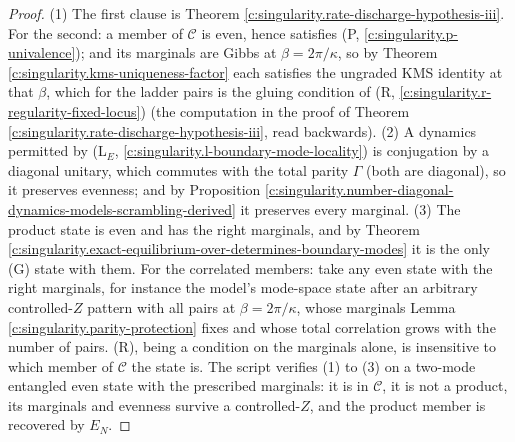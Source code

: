 \documentclass[11pt]{article}
\theoremstyle{definition}
\theoremstyle{plain}
\providecommand{\EN}{}\renewcommand{\EN}{E_{N}}
\begin{document}
\begin{proof}
(1) The first clause is Theorem \ref{c:singularity.rate-discharge-hypothesis-iii}. For the second: a member of $\mathcal{C}$ is even, hence satisfies (P, \ref{c:singularity.p-univalence}); and its marginals are Gibbs at $\beta = 2\pi/\kappa$, so by Theorem \ref{c:singularity.kms-uniqueness-factor} each satisfies the ungraded KMS identity at that $\beta$, which for the ladder pairs is the gluing condition of (R, \ref{c:singularity.r-regularity-fixed-locus}) (the computation in the proof of Theorem \ref{c:singularity.rate-discharge-hypothesis-iii}, read backwards). (2) A dynamics permitted by (L$_E$, \ref{c:singularity.l-boundary-mode-locality}) is conjugation by a diagonal unitary, which commutes with the total parity $\Gamma$ (both are diagonal), so it preserves evenness; and by Proposition \ref{c:singularity.number-diagonal-dynamics-models-scrambling-derived} it preserves every marginal. (3) The product state is even and has the right marginals, and by Theorem \ref{c:singularity.exact-equilibrium-over-determines-boundary-modes} it is the only (G) state with them. For the correlated members: take any even state with the right marginals, for instance the model's mode-space state after an arbitrary controlled-$Z$ pattern with all pairs at $\beta = 2\pi/\kappa$, whose marginals Lemma \ref{c:singularity.parity-protection} fixes and whose total correlation grows with the number of pairs. (R), being a condition on the marginals alone, is insensitive to which member of $\mathcal{C}$ the state is. The script verifies (1) to (3) on a two-mode entangled even state with the prescribed marginals: it is in $\mathcal{C}$, it is not a product, its marginals and evenness survive a controlled-$Z$, and the product member is recovered by $\EN$.

\end{proof}
\end{document}
